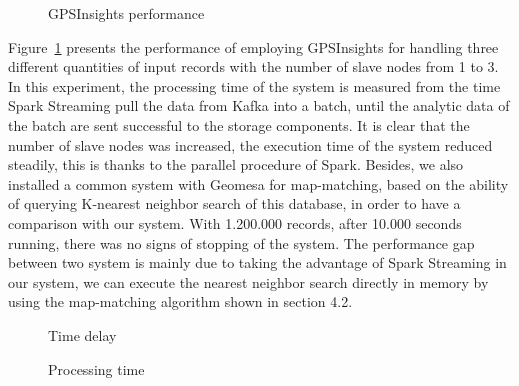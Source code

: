 \documentclass{acm_proc_article-sp}
\begin{document}
	
	\begin{figure}[h]
		\centering
		\caption{GPSInsights performance}
		\label{fig:performance}
	\end{figure}

Figure~\ref{fig:performance} presents the performance of employing GPSInsights for handling three different quantities of input records with the number of slave nodes from 1 to 3. In this experiment, the processing time of the system is measured from the time Spark Streaming pull the data from Kafka into a batch, until the analytic data of the batch are sent successful to the storage components. It is clear that the number of slave nodes was increased, the execution time of the system reduced steadily, this is thanks to the parallel procedure of Spark. Besides, we also installed a common system with Geomesa for map-matching, based on the ability of querying K-nearest neighbor search of this database, in order to have a comparison with our system. With 1.200.000 records, after 10.000 seconds running, there was no signs of stopping of the system. The performance gap between two system is mainly due to taking the advantage of Spark Streaming in our system,  we can execute the nearest neighbor search directly in memory by using the map-matching algorithm shown in section 4.2.

	\begin{figure}[h]
		\centering
		\caption{Time delay}
		\label{fig:timedelay}
	\end{figure}
	
	\begin{figure}[h]
		\centering
		\caption{Processing time}
		\label{fig:processingtime}
	\end{figure}
	
\end{document}
